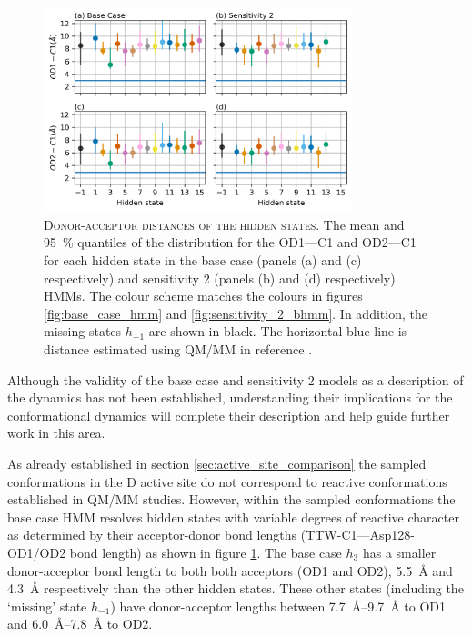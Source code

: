 \begin{figure}
    \centering
    \includegraphics[width=0.8\textwidth]{chapters/aadh/figures/bond_dist_h_states.png}
    \caption[Donor-acceptor distances of the hidden states]{\textsc{Donor-acceptor distances of the hidden states}. The mean and \SI{95}{\percent} quantiles of the distribution for the OD1---C1 and OD2---C1  for each hidden state in the base case (panels (a) and (c) respectively) and sensitivity 2 (panels (b) and (d) respectively) HMMs. The colour scheme matches the colours in figures \ref{fig:base_case_hmm} and \ref{fig:sensitivity_2_bhmm}. In addition, the missing states $h_{-1}$ are shown in black. The horizontal blue line is distance estimated using QM/MM in reference \cite{ranaghanInitioQMMM2017}.}
    \label{fig:addh_bond_dist_h_state}
\end{figure}

Although the validity of the base case and sensitivity 2 models as a description of the dynamics has not been established, understanding their implications for the conformational dynamics will complete their description and help guide further work in this area. 

As already established in section \ref{sec:active_site_comparison} the sampled conformations in the D active site do not correspond to reactive conformations established in QM/MM studies.  However, within the sampled conformations the base case HMM resolves hidden states with variable degrees of reactive character as determined  by their acceptor-donor bond lengths (TTW-C1---Asp128-OD1/OD2 bond length) as shown in figure \ref{fig:addh_bond_dist_h_state}. The base case $h_{3}$ has a smaller donor-acceptor bond length to both both acceptors (OD1 and OD2), \SI{5.5}{\angstrom} and \SI{4.3}{\angstrom} respectively than the other hidden states. These other states (including the `missing' state $h_{-1}$) have donor-acceptor lengths between \SIrange{7.7}{9.7}{\angstrom} to OD1 and \SIrange{6.0}{7.8}{\angstrom} to OD2. 

